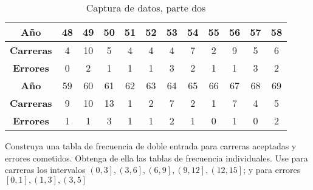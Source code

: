 \begin{table}[h!]
    \centering
    \begin{tabular}{cccccccccccc}
        \hline
        \multicolumn{1}{|c|}{\textbf{Año}} & \multicolumn{1}{c|}{48} & \multicolumn{1}{c|}{49} & \multicolumn{1}{c|}{50} & \multicolumn{1}{c|}{51} & \multicolumn{1}{c|}{52} & \multicolumn{1}{c|}{53} & \multicolumn{1}{c|}{54} & \multicolumn{1}{c|}{55} & \multicolumn{1}{c|}{56} & \multicolumn{1}{c|}{57} & \multicolumn{1}{c|}{58} \\ \hline
        \textbf{Carreras}                  & 4                       & 10                      & 5                       & 4                       & 4                       & 4                       & 7                       & 2                       & 9                       & 5                       & 6                       \\
        \textbf{Errores}                   & 0                       & 2                       & 1                       & 1                       & 1                       & 3                       & 2                       & 1                       & 1                       & 3                       & 2                       \\ \hline
        \multicolumn{1}{|c|}{\textbf{Año}} & \multicolumn{1}{c|}{59} & \multicolumn{1}{c|}{60} & \multicolumn{1}{c|}{61} & \multicolumn{1}{c|}{62} & \multicolumn{1}{c|}{63} & \multicolumn{1}{c|}{64} & \multicolumn{1}{c|}{65} & \multicolumn{1}{c|}{66} & \multicolumn{1}{c|}{67} & \multicolumn{1}{c|}{68} & \multicolumn{1}{c|}{69} \\ \hline
        \textbf{Carreras}                  & 9                       & 10                      & 13                      & 1                       & 2                       & 7                       & 2                       & 1                       & 7                       & 4                       & 5                       \\
        \textbf{Errores}                   & 1                       & 1                       & 3                       & 1                       & 1                       & 2                       & 1                       & 0                       & 1                       & 0                       & 2
    \end{tabular}
    \caption{Captura de datos, parte dos}
    \label{tabme3}
\end{table}

Construya una tabla de frecuencia de doble
entrada para carreras aceptadas y errores
cometidos. Obtenga de ella las tablas de
frecuencia individuales. Use para carreras los
intervalos $\left( 0,3\right],\left( 3,6\right],\left( 6,9\right],\left( 9,12\right],\left( 12,15\right]$; y para errores $\left[ 0,1\right],\left( 1,3\right],\left( 3,5\right]$


